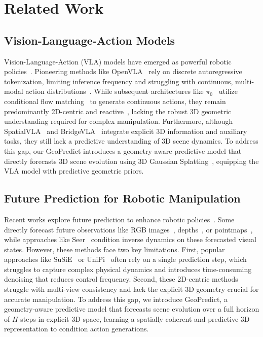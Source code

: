 \section{Related Work} \label{sec:related_work}

\subsection{Vision-Language-Action Models}

Vision-Language-Action (VLA) models have emerged as powerful robotic policies~\cite{brohan2022rt, kim2025openvla, li2024cogact, zheng2024tracevla, zheng2025universal, xiao2025ava}. Pioneering methods like OpenVLA~\cite{kim2025openvla} rely on discrete autoregressive tokenization, limiting inference frequency and struggling with continuous, multi-modal action distributions~\cite{zhong2025survey}. While subsequent architectures like $\pi_0$~\cite{black2410pi0} utilize conditional flow matching~\cite{lipman2022flow} to generate continuous actions, they remain predominantly 2D-centric and reactive~\cite{bu2025univla, black2410pi0, hu2025video, zheng2024tracevla}, lacking the robust 3D geometric understanding required for complex manipulation. Furthermore, although SpatialVLA~\cite{qu2025spatialvla} and BridgeVLA~\cite{li2025bridgevla} integrate explicit 3D information and auxiliary tasks, they still lack a predictive understanding of 3D scene dynamics. To address this gap, our GeoPredict introduces a geometry-aware predictive model that directly forecasts 3D scene evolution using 3D Gaussian Splatting~\cite{kerbl20233d}, equipping the VLA model with predictive geometric priors.



\subsection{Future Prediction for Robotic Manipulation}

Recent works explore future prediction to enhance robotic policies~\cite{cen2025worldvla, zhang2023storm, hafnermastering, micheli2022transformers, hansen2023td, hafner2022deep}. Some directly forecast future observations like RGB images~\cite{wu2024unleashing, hu2025video}, depths~\cite{zhangdreamvla}, or pointmaps~\cite{liu2025geometry}, while approaches like Seer~\cite{tianpredictive} condition inverse dynamics on these forecasted visual states. However, these methods face two key limitations. First, popular approaches like SuSiE~\cite{black2023zero} or UniPi~\cite{du2023learning} often rely on a single prediction step, which struggles to capture complex physical dynamics and introduces time-consuming denoising that reduces control frequency. Second, these 2D-centric methods~\cite{wu2024unleashing} struggle with multi-view consistency and lack the explicit 3D geometry crucial for accurate manipulation. To address this gap, we introduce GeoPredict, a geometry-aware predictive model that forecasts scene evolution over a full horizon of $H$ steps in explicit 3D space, learning a spatially coherent and predictive 3D representation to condition action generations.



